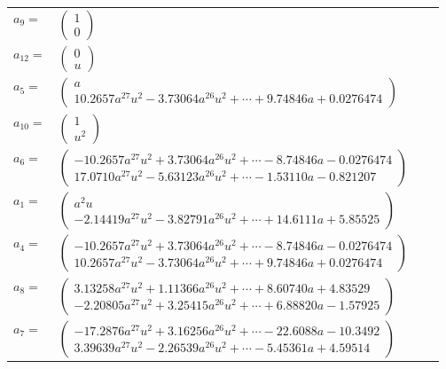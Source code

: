 \documentclass[1p]{elsarticle_modified}
\theoremstyle{definition}
\begin{document}
\begin{tabular}{m{7pt} m{180pt} m{7pt} m{180pt} }
\flushright $a_{9}=$&$\begin{pmatrix}1\\0\end{pmatrix}$ \\
\flushright $a_{12}=$&$\begin{pmatrix}0\\u\end{pmatrix}$ \\
\flushright $a_{5}=$&$\begin{pmatrix}a\\10.2657 a^{27} u^{2}-3.73064 a^{26} u^{2}+\cdots+9.74846 a+0.0276474\end{pmatrix}$ \\
\flushright $a_{10}=$&$\begin{pmatrix}1\\u^2\end{pmatrix}$ \\
\flushright $a_{6}=$&$\begin{pmatrix}-10.2657 a^{27} u^{2}+3.73064 a^{26} u^{2}+\cdots-8.74846 a-0.0276474\\17.0710 a^{27} u^{2}-5.63123 a^{26} u^{2}+\cdots-1.53110 a-0.821207\end{pmatrix}$ \\
\flushright $a_{1}=$&$\begin{pmatrix}a^2 u\\-2.14419 a^{27} u^{2}-3.82791 a^{26} u^{2}+\cdots+14.6111 a+5.85525\end{pmatrix}$ \\
\flushright $a_{4}=$&$\begin{pmatrix}-10.2657 a^{27} u^{2}+3.73064 a^{26} u^{2}+\cdots-8.74846 a-0.0276474\\10.2657 a^{27} u^{2}-3.73064 a^{26} u^{2}+\cdots+9.74846 a+0.0276474\end{pmatrix}$ \\
\flushright $a_{8}=$&$\begin{pmatrix}3.13258 a^{27} u^{2}+1.11366 a^{26} u^{2}+\cdots+8.60740 a+4.83529\\-2.20805 a^{27} u^{2}+3.25415 a^{26} u^{2}+\cdots+6.88820 a-1.57925\end{pmatrix}$ \\
\flushright $a_{7}=$&$\begin{pmatrix}-17.2876 a^{27} u^{2}+3.16256 a^{26} u^{2}+\cdots-22.6088 a-10.3492\\3.39639 a^{27} u^{2}-2.26539 a^{26} u^{2}+\cdots-5.45361 a+4.59514\end{pmatrix}$ \\

\end{tabular}
\end{document}
